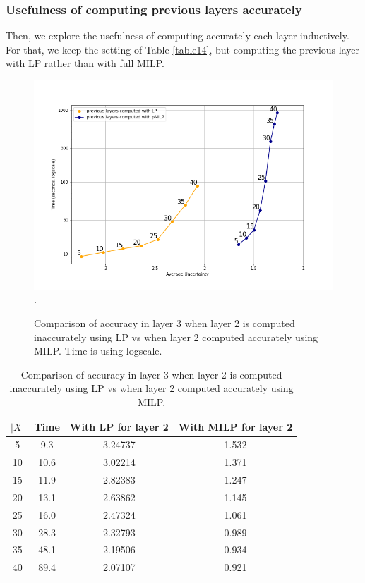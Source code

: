 \iffalse

\subsubsection*{Usefulness of computing previous layers accurately}	


Then, we explore the usefulness of computing accurately each layer inductively.
For that, we keep the setting of  Table \ref{table14}, but computing the previous layer with LP rather than with full MILP.


\begin{figure}[h!]
	\hspace*{-0.8cm}
	\includegraphics[scale=0.6]{Layer3_comparison_LP}.
	\caption{Comparison of accuracy in layer 3 when layer 2 is computed inaccurately using LP vs when layer 2 computed accurately using MILP.
	Time is using logscale.}
	\label{fig3LP}
\end{figure}








\begin{table}[h!]
	\caption{Comparison of accuracy in layer 3 when layer 2 is computed inaccurately using LP vs when layer 2 computed accurately using MILP.}
	\centering
\begin{tabular}{|c|c|c|c|}
	\hline
	$|X|$ & Time &  With LP for layer 2 & With MILP for layer 2 \\ 
	\hline	5 & 9.3 & 3.24737  &1.532\\
	\hline	10 & 10.6 & 3.02214 & 1.371\\
	\hline	15 & 11.9 & 2.82383  &1.247\\
	\hline	20 & 13.1 & 2.63862 & 1.145\\
	\hline	25 & 16.0 & 2.47324 & 1.061\\
	\hline	30 & 28.3 & 2.32793  &0.989\\
	\hline	35 & 48.1 & 2.19506 & 0.934\\
	\hline	40 & 89.4 & 2.07107 & 0.921\\	
	\hline	
\end{tabular}
\label{table15}
\end{table}



